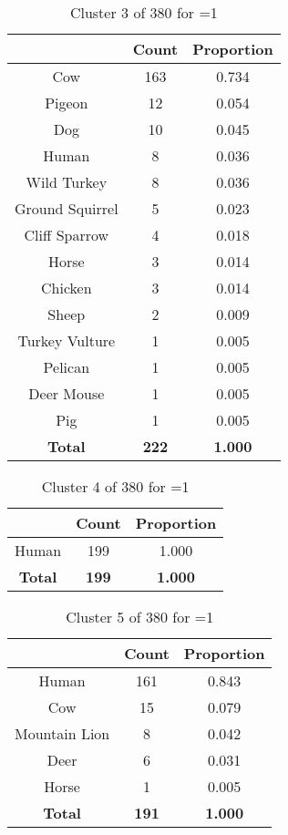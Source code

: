 \begin{table}[ht!]
\centering
\begin{tabular}{|c|c|c|}
\hline
\bf \Spec{} &\bf Count &\bf Proportion\\ \hline \hline
Cow & 163 & 0.734\\ \hline
Pigeon & 12 & 0.054\\ \hline
Dog & 10 & 0.045\\ \hline
Human & 8 & 0.036\\ \hline
Wild Turkey & 8 & 0.036\\ \hline
Ground Squirrel & 5 & 0.023\\ \hline
Cliff Sparrow & 4 & 0.018\\ \hline
Horse & 3 & 0.014\\ \hline
Chicken & 3 & 0.014\\ \hline
Sheep & 2 & 0.009\\ \hline
Turkey Vulture & 1 & 0.005\\ \hline
Pelican & 1 & 0.005\\ \hline
Deer Mouse & 1 & 0.005\\ \hline
Pig & 1 & 0.005\\ \hline
\hline
\bf Total & \bf 222 & \bf 1.000\\ \hline
\end{tabular}
\label{tab:cluster:3:1}
\caption{Cluster 3 of 380 for \minneigh{}=1}
\end{table}

\begin{table}[ht!]
\centering
\begin{tabular}{|c|c|c|}
\hline
\bf \Spec{} &\bf Count &\bf Proportion\\ \hline \hline
Human & 199 & 1.000\\ \hline
\hline
\bf Total & \bf 199 & \bf 1.000\\ \hline
\end{tabular}
\label{tab:cluster:4:1}
\caption{Cluster 4 of 380 for \minneigh{}=1}
\end{table}

\begin{table}[ht!]
\centering
\begin{tabular}{|c|c|c|}
\hline
\bf \Spec{} &\bf Count &\bf Proportion\\ \hline \hline
Human & 161 & 0.843\\ \hline
Cow & 15 & 0.079\\ \hline
Mountain Lion & 8 & 0.042\\ \hline
Deer & 6 & 0.031\\ \hline
Horse & 1 & 0.005\\ \hline
\hline
\bf Total & \bf 191 & \bf 1.000\\ \hline
\end{tabular}
\label{tab:cluster:5:1}
\caption{Cluster 5 of 380 for \minneigh{}=1}
\end{table}

